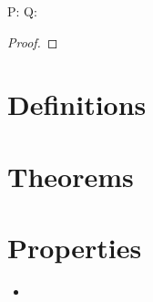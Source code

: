 \documentclass{article} %
\theoremstyle{plain}
\theoremstyle{definition}
\theoremstyle{case}
\begin{document}
\begin{enumerate}[label={\fbox{\textbf{Exercise \#\arabic* :}}}]
P: 
Q:

\begin{proof}
\end{proof} 

\newpage
\end{enumerate}

\newpage

\section*{Definitions}

\section*{Theorems}

\section*{Properties}
  \begin{itemize}
        \item
  \end{itemize}
\end{document}
